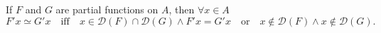 If $F$ and $G$ are partial functions on $A$, then $\forall x \in A$
$$F'x \simeq G'x \quad \text{iff} \quad x \in \mathcal{D}(F) \cap \mathcal{D}(G) \land F'x = G'x \quad \text{or} \quad x \notin \mathcal{D}(F) \land x \notin \mathcal{D}(G).$$

